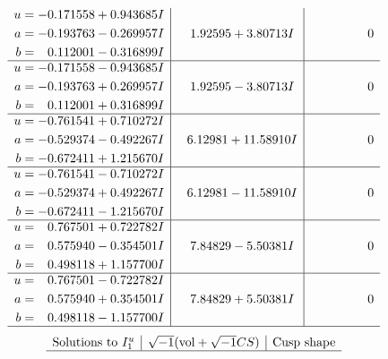 \documentclass[1p]{elsarticle_modified}
\theoremstyle{definition}
\newcommand{\I}{\sqrt{-1}}
\begin{document}
$$\begin{array}{c|c|c}
\begin{aligned}
u &= -0.171558 + 0.943685 I \\
a &= -0.193763 - 0.269957 I \\
b &= \phantom{-}0.112001 - 0.316899 I\end{aligned}
 & \phantom{-}1.92595 + 3.80713 I & \phantom{-0.000000 } 0 \\ \hline\begin{aligned}
u &= -0.171558 - 0.943685 I \\
a &= -0.193763 + 0.269957 I \\
b &= \phantom{-}0.112001 + 0.316899 I\end{aligned}
 & \phantom{-}1.92595 - 3.80713 I & \phantom{-0.000000 } 0 \\ \hline\begin{aligned}
u &= -0.761541 + 0.710272 I \\
a &= -0.529374 - 0.492267 I \\
b &= -0.672411 + 1.215670 I\end{aligned}
 & \phantom{-}6.12981 + 11.58910 I & \phantom{-0.000000 } 0 \\ \hline\begin{aligned}
u &= -0.761541 - 0.710272 I \\
a &= -0.529374 + 0.492267 I \\
b &= -0.672411 - 1.215670 I\end{aligned}
 & \phantom{-}6.12981 - 11.58910 I & \phantom{-0.000000 } 0 \\ \hline\begin{aligned}
u &= \phantom{-}0.767501 + 0.722782 I \\
a &= \phantom{-}0.575940 - 0.354501 I \\
b &= \phantom{-}0.498118 + 1.157700 I\end{aligned}
 & \phantom{-}7.84829 - 5.50381 I & \phantom{-0.000000 } 0 \\ \hline\begin{aligned}
u &= \phantom{-}0.767501 - 0.722782 I \\
a &= \phantom{-}0.575940 + 0.354501 I \\
b &= \phantom{-}0.498118 - 1.157700 I\end{aligned}
 & \phantom{-}7.84829 + 5.50381 I & \phantom{-0.000000 } 0\\
 \hline 
 \end{array}$$\newpage$$\begin{array}{c|c|c}  
\text{Solutions to }I^u_{1}& \I (\text{vol} + \sqrt{-1}CS) & \text{Cusp shape}\\
 \hline 

\end{array}$$
\end{document}
